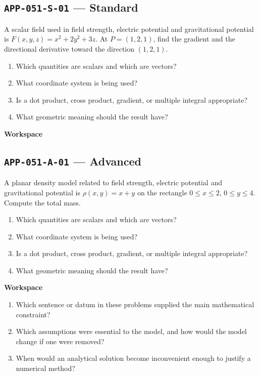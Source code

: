 \documentclass[11pt]{book}
\newcommand{\pid}[1]{\texttt{#1}}
\newcommand{\workspace}{\par\vspace{0.7in}\hrulefill\par\vspace{0.55in}\hrulefill\par}
\begin{document}
\subsection*{\pid{APP-051-S-01} — Standard}
\begin{problembox}
A scalar field used in field strength, electric potential and gravitational potential is $F(x,y,z)=x^2+2y^2+3z$. At $P=(1,2,1)$, find the gradient and the directional derivative toward the direction $(1,2,1)$.
\end{problembox}
\begin{promptbox}\begin{enumerate}
\item Which quantities are scalars and which are vectors?
\item What coordinate system is being used?
\item Is a dot product, cross product, gradient, or multiple integral appropriate?
\item What geometric meaning should the result have?
\end{enumerate}\end{promptbox}
\textbf{Workspace}\workspace
{}
\subsection*{\pid{APP-051-A-01} — Advanced}
\begin{problembox}
A planar density model related to field strength, electric potential and gravitational potential is $\rho(x,y)=x+y$ on the rectangle $0\le x\le 2$, $0\le y\le 4$. Compute the total mass.
\end{problembox}
\begin{promptbox}\begin{enumerate}
\item Which quantities are scalars and which are vectors?
\item What coordinate system is being used?
\item Is a dot product, cross product, gradient, or multiple integral appropriate?
\item What geometric meaning should the result have?
\end{enumerate}\end{promptbox}
\textbf{Workspace}\workspace
\begin{reflectionbox}\begin{enumerate}
\item Which sentence or datum in these problems supplied the main mathematical constraint?
\item Which assumptions were essential to the model, and how would the model change if one were removed?
\item When would an analytical solution become inconvenient enough to justify a numerical method?
\end{enumerate}\end{reflectionbox}
\end{document}
